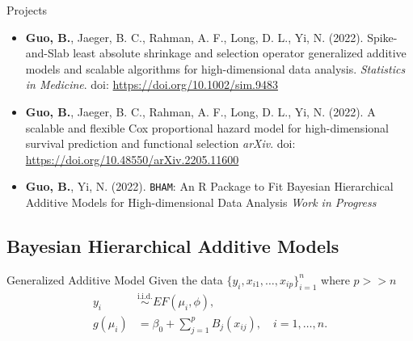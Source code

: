 \documentclass[
  ignorenonframetext,
  aspectratio=169]{beamer}
\begin{document}
\begin{frame}[fragile]{Projects}
\protect\hypertarget{projects}{}
\begin{itemize}
\item
  \textbf{Guo, B.}, Jaeger, B. C., Rahman, A. F., Long, D. L., Yi, N.
  (2022). Spike-and-Slab least absolute shrinkage and selection operator
  generalized additive models and scalable algorithms for
  high-dimensional data analysis. \emph{Statistics in Medicine}. doi:
  \url{https://doi.org/10.1002/sim.9483}
\item
  \textbf{Guo, B.}, Jaeger, B. C., Rahman, A. F., Long, D. L., Yi, N.
  (2022). A scalable and flexible Cox proportional hazard model for
  high-dimensional survival prediction and functional selection
  \emph{arXiv}. doi: \url{https://doi.org/10.48550/arXiv.2205.11600}
\item
  \textbf{Guo, B.}, Yi, N. (2022). \texttt{BHAM}: An R Package to Fit
  Bayesian Hierarchical Additive Models for High-dimensional Data
  Analysis \emph{Work in Progress}
\end{itemize}
\end{frame}

\hypertarget{bayesian-hierarchical-additive-models}{%
\subsection{Bayesian Hierarchical Additive
Models}\label{bayesian-hierarchical-additive-models}}

\begin{frame}{Generalized Additive Model}
\protect\hypertarget{generalized-additive-model}{}
Given the data \(\{y_i, x_{i1}, \dots ,x_{ip}\}_{i=1}^n\) where
\(p >> n\) \begin{align*}
y_i &\overset{\text{i.i.d.}}{\sim} EF(\mu_i, \phi),\\
g(\mu_i) &= \beta_0 + \sum\limits^p_{j=1}B_j(x_{ij}) , \quad i = 1, \dots, n.
\end{align*}
\end{frame}
\end{document}
